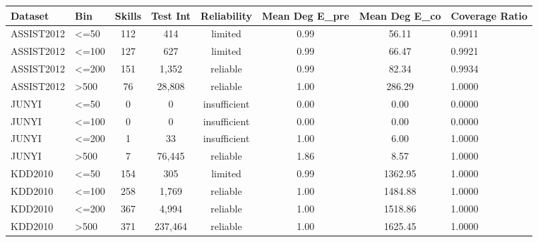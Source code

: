 \begin{tabular}{llcccccl}
\hline
Dataset & Bin & Skills & Test Int & Reliability & Mean Deg E\_pre & Mean Deg E\_co & Coverage Ratio \\
\hline
ASSIST2012 & <=50 & 112 & 414 & limited & 0.99 & 56.11 & 0.9911 \\
ASSIST2012 & <=100 & 127 & 627 & limited & 0.99 & 66.47 & 0.9921 \\
ASSIST2012 & <=200 & 151 & 1,352 & reliable & 0.99 & 82.34 & 0.9934 \\
ASSIST2012 & >500 & 76 & 28,808 & reliable & 1.00 & 286.29 & 1.0000 \\
JUNYI & <=50 & 0 & 0 & insufficient & 0.00 & 0.00 & 0.0000 \\
JUNYI & <=100 & 0 & 0 & insufficient & 0.00 & 0.00 & 0.0000 \\
JUNYI & <=200 & 1 & 33 & insufficient & 1.00 & 6.00 & 1.0000 \\
JUNYI & >500 & 7 & 76,445 & reliable & 1.86 & 8.57 & 1.0000 \\
KDD2010 & <=50 & 154 & 305 & limited & 0.99 & 1362.95 & 1.0000 \\
KDD2010 & <=100 & 258 & 1,769 & reliable & 1.00 & 1484.88 & 1.0000 \\
KDD2010 & <=200 & 367 & 4,994 & reliable & 1.00 & 1518.86 & 1.0000 \\
KDD2010 & >500 & 371 & 237,464 & reliable & 1.00 & 1625.45 & 1.0000 \\
\hline
\end{tabular}
